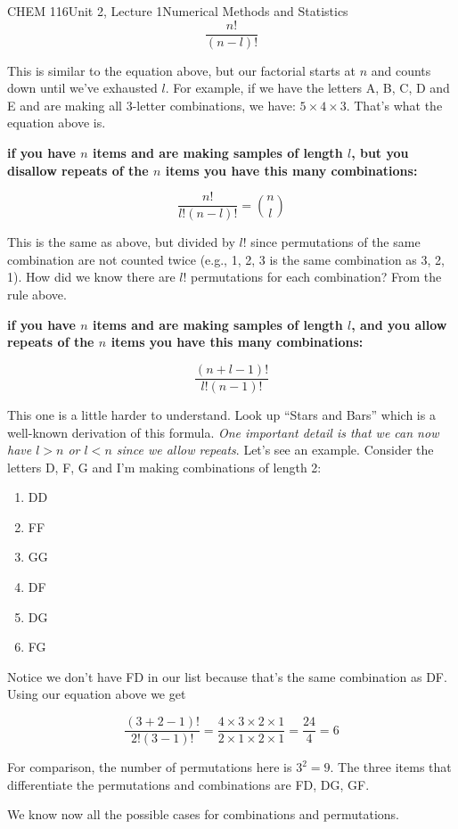 \documentclass{article}
\begin{document}
\begin{tdoc}{CHEM 116}{Unit 2, Lecture 1}{Numerical Methods and Statistics}
  $$  \frac{n!}{(n - l)!}$$

  This is similar to the equation above, but our factorial starts at
  $n$ and counts down until we've exhausted $l$. For example, if we
  have the letters A, B, C, D and E and are making all 3-letter
  combinations, we have: $5 \times 4 \times 3$. That's what the
  equation above is.

  {\bf if you have $n$ items and are making samples of length $l$, but you disallow repeats of the $n$ items you have this many combinations:}

  $$  \frac{n!}{l!(n - l)!} = \binom{n}{l}$$

  This is the same as above, but divided by $l!$ since permutations of
  the same combination are not counted twice (e.g., 1, 2, 3 is the
  same combination as 3, 2, 1). How did we know there are $l!$
  permutations for each combination? From the rule above.

  {\bf if you have $n$ items and are making samples of length $l$, and you allow repeats of the $n$ items you have this many combinations:}

  $$
  \frac{(n + l - 1)!}{l!(n - 1)!}
  $$

  This one is a little harder to understand. Look up ``Stars and
  Bars'' which is a well-known derivation of this formula. {\it One
    important detail is that we can now have $l > n$ or $l < n$ since we allow
    repeats}. Let's see an example. Consider the letters D, F, G and
  I'm making combinations of length 2:

  \begin{enumerate}
  \item DD
  \item FF
  \item GG    
  \item DF
  \item DG
  \item FG
  \end{enumerate}

  Notice we don't have FD in our list because that's the same combination as DF.  Using our equation above we get

  $$
  \frac{(3 + 2 - 1)!}{2!(3 - 1)!} = \frac{4\times3\times2\times1}{2\times1\times2\times1} = \frac{24}{4} = 6
  $$

  For comparison, the number of permutations here is $3^2 = 9$. The
  three items that differentiate the permutations and combinations are
  FD, DG, GF.

  We know now all the possible cases for combinations and
  permutations.


\end{tdoc}
\end{document}
